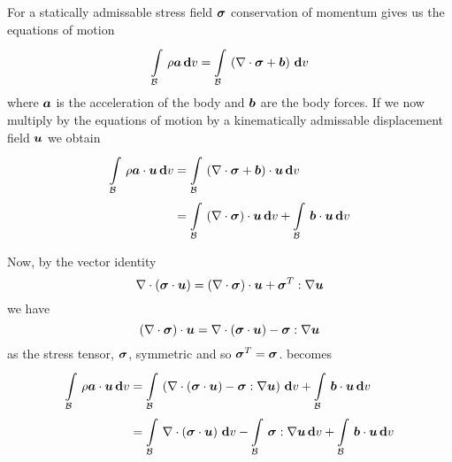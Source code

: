 For a statically admissable stress field $\boldsymbol{\mathit{\sigma}}$ conservation of
momentum gives us the equations of motion \ie
\begin{equation}
  \gint{\embedmanifold{B}}{}{\rho\vectr{a}}{v}=\gint{\embedmanifold{B}}{}{\pbrac{\divergence{}{\tensor{\sigma}}+\vectr{b}}}{v}
\end{equation}
where $\boldsymbol{a}$ is the acceleration of the body and $\boldsymbol{b}$ are the body
forces. If we now multiply by the equations of motion by a kinematically
admissable displacement field $\boldsymbol{u}$ we obtain
\begin{equation}
  \begin{split}
    \gint{\embedmanifold{B}}{}{\dotprod{\rho\vectr{a}}{\vectr{u}}}{v} &=
    \gint{\embedmanifold{B}}{}{\dotprod{\pbrac{\divergence{}{\tensor{\sigma}}+\vectr{b}}}{\vectr{u}}}{v}\\
    &=\gint{\embedmanifold{B}}{}{\dotprod{\pbrac{\divergence{}{\tensor{\sigma}}}}{\vectr{u}}}{v}+
    \gint{\embedmanifold{B}}{}{\dotprod{\vectr{b}}{\vectr{u}}}{v}
  \end{split}
  \label{eqn:equationsofwork}
\end{equation}

Now, by the vector identity
\begin{equation}
  \divergence{}{\pbrac{\dotprod{\tensortwo{\sigma}}{\vectr{u}}}}=\dotprod{\pbrac{\divergence{}{\tensortwo{\sigma}}}}{\vectr{u}}+
  \doubledotprod{\transpose{\tensortwo{\sigma}}}{\gradient{}{\vectr{u}}}
\end{equation}
we have
\begin{equation}
  \dotprod{\pbrac{\divergence{}{\tensortwo{\sigma}}}}{\vectr{u}}=\divergence{}{\pbrac{\dotprod{\tensortwo{\sigma}}{\vectr{u}}}}-
  \doubledotprod{\tensortwo{\sigma}}{\gradient{}{\vectr{u}}}
\end{equation}
as the stress tensor, $\boldsymbol{\mathit{\sigma}}$, symmetric and so
${\boldsymbol{\mathit{\sigma}}}^{T}=\boldsymbol{\mathit{\sigma}}$.  becomes
\begin{equation}
  \begin{split}
    \gint{\embedmanifold{B}}{}{\dotprod{\rho\vectr{a}}{\vectr{u}}}{v}&=
    \gint{\embedmanifold{B}}{}{\pbrac{\divergence{}{\pbrac{\dotprod{\tensor{\sigma}}{\vectr{u}}}}-
        \doubledotprod{\tensor{\sigma}}{\gradient{}{\vectr{u}}}}}{v}+
    \gint{\embedmanifold{B}}{}{\dotprod{\vectr{b}}{\vectr{u}}}{v} \\
    &=\gint{\embedmanifold{B}}{}{\divergence{}{\pbrac{\dotprod{\tensor{\sigma}}{\vectr{u}}}}}{v}-
    \gint{\embedmanifold{B}}{}{\doubledotprod{\tensor{\sigma}}{\gradient{}{\vectr{u}}}}{v}+
    \gint{\embedmanifold{B}}{}{\dotprod{\vectr{b}}{\vectr{u}}}{v}
  \end{split}
\end{equation}

